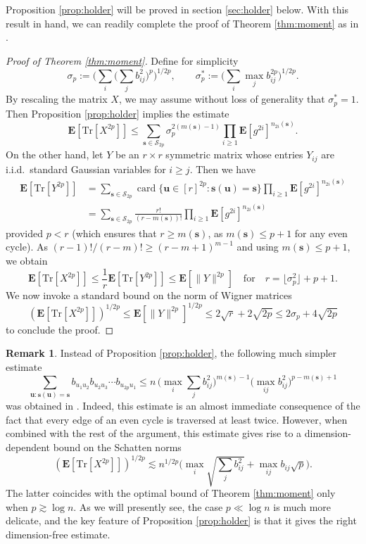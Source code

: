 \documentclass[10pt,reqno]{amsart}
\theoremstyle{definition}
\newtheorem{rem}[thm]{Remark}
\numberwithin{equation}{section}
\numberwithin{figure}{section}
\numberwithin{table}{section}
\newcommand{\card}{\mathop{\mathrm{card}}}
\begin{document}
Proposition \ref{prop:holder} will be proved in section 
\ref{sec:holder} below. With this result in hand, we can 
readily complete the proof of Theorem \ref{thm:moment} as in \cite{BvH16}.

\begin{proof}[Proof of Theorem \ref{thm:moment}]
Define for simplicity
$$
	\sigma_p :=
	\Bigg(\sum_i\Bigg(\sum_j b_{ij}^2\Bigg)^p\Bigg)^{1/2p},
	\qquad
	\sigma_p^* := \Bigg(\sum_i \max_j b_{ij}^{2p}\Bigg)^{1/2p}.
$$
By rescaling the matrix $X$, we may assume without loss of generality
that $\sigma_p^*=1$. Then Proposition \ref{prop:holder} implies the estimate
$$
	\mathbf{E}[\mathrm{Tr}[X^{2p}]] \le
	\sum_{\mathbf{s}\in\mathcal{S}_{2p}}
	\sigma_p^{2(m(\mathbf{s})-1)}
	\prod_{i\ge 1} \mathbf{E}[g^{2i}]^{n_{2i}(\mathbf{s})}.
$$
On the other hand, let $Y$ be an $r\times r$ symmetric matrix
whose entries $Y_{ij}$ are i.i.d.\ standard Gaussian variables for $i\ge j$.
Then we have
\begin{align*}
	\mathbf{E}[\mathrm{Tr}[Y^{2p}]] &=
	\sum_{\mathbf{s}\in\mathcal{S}_{2p}}
	\card\{\mathbf{u}\in[r]^{2p}:\mathbf{s}(\mathbf{u})=\mathbf{s}\}
	\prod_{i\ge 1} \mathbf{E}[g^{2i}]^{n_{2i}(\mathbf{s})}
	\\
	&=\sum_{\mathbf{s}\in\mathcal{S}_{2p}}
	\frac{r!}{(r-m(\mathbf{s}))!}
	\prod_{i\ge 1} \mathbf{E}[g^{2i}]^{n_{2i}(\mathbf{s})}
\end{align*}
provided $p<r$ (which ensures that $r\ge m(\mathbf{s})$, as
$m(\mathbf{s})\le p+1$ for any even cycle).
As $(r-1)!/(r-m)!\ge (r-m+1)^{m-1}$ and using $m(\mathbf{s})\le p+1$,
we obtain
$$
	\mathbf{E}[\mathrm{Tr}[X^{2p}]] \le
	\frac{1}{r}\mathbf{E}[\mathrm{Tr}[Y^{2p}]]
	\le \mathbf{E}[\|Y\|^{2p}]
	\quad\mbox{for}\quad
	r=\lfloor\sigma_p^2\rfloor+p+1.
$$
We now invoke a standard bound on the norm of
Wigner matrices \cite[Lemma 2.2]{BvH16}
$$
	(\mathbf{E}[\mathrm{Tr}[X^{2p}]])^{1/2p} \le
	\mathbf{E}[\|Y\|^{2p}]^{1/2p} \le
	2\sqrt{r}+2\sqrt{2p} \le
	2\sigma_p + 4\sqrt{2p}
$$
to conclude the proof.
\end{proof}

\begin{rem}
Instead of Proposition \ref{prop:holder}, the following much simpler 
estimate 
$$
	\sum_{\mathbf{u}:\mathbf{s}(\mathbf{u})=\mathbf{s}}
	b_{u_1u_2}b_{u_2u_3}\cdots b_{u_{2p}u_1}
	\le
	n\,\Bigg(\max_i\sum_j b_{ij}^2\Bigg)^{m(\mathbf{s})-1}
	\Bigg(\max_{ij} b_{ij}^2\Bigg)^{p-m(\mathbf{s})+1}
$$
was obtained in \cite[Lemma 2.5]{BvH16}. Indeed, this estimate is an 
almost immediate consequence of the fact that every edge of an even cycle
is traversed at least twice. However, when combined with the rest of the 
argument, this estimate gives rise to a dimension-dependent bound on the 
Schatten norms
$$
	(\mathbf{E}[\mathrm{Tr}[X^{2p}]])^{1/2p} \lesssim
	n^{1/2p}\Bigg(
	\max_i\sqrt{\sum_j b_{ij}^2} + \max_{ij}b_{ij}\sqrt{p}\Bigg).
$$
The latter coincides with the optimal bound of Theorem \ref{thm:moment} 
only when $p\gtrsim\log n$. As we will presently see, the case $p\ll\log 
n$ is much more delicate, and the key feature of Proposition 
\ref{prop:holder} is that it gives the right dimension-free estimate.
\end{rem}
\end{document}
